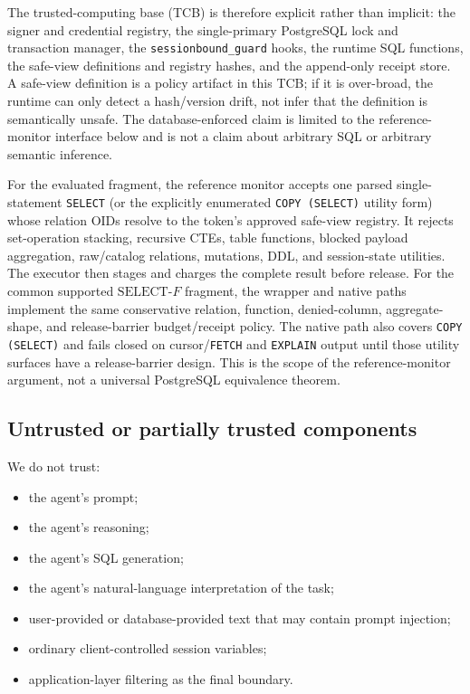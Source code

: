 \documentclass[journal]{IEEEtran}
\providecommand{\tightlist}{%
  \setlength{\itemsep}{0pt}\setlength{\parskip}{0pt}}
\begin{document}
The trusted-computing base (TCB) is therefore explicit rather than implicit:
the signer and credential registry, the single-primary PostgreSQL lock and
transaction manager, the \texttt{sessionbound\_guard} hooks, the runtime SQL
functions, the safe-view definitions and registry hashes, and the append-only
receipt store. A safe-view definition is a policy artifact in this TCB; if it
is over-broad, the runtime can only detect a hash/version drift, not infer that
the definition is semantically unsafe. The database-enforced claim is limited
to the reference-monitor interface below and is not a claim about arbitrary
SQL or arbitrary semantic inference.

For the evaluated fragment, the reference monitor accepts one parsed
single-statement \texttt{SELECT} (or the explicitly enumerated
\texttt{COPY (SELECT)} utility form) whose relation OIDs resolve to the token's approved
safe-view registry. It rejects set-operation stacking, recursive CTEs, table
functions, blocked payload aggregation, raw/catalog relations, mutations,
DDL, and session-state utilities. The executor then stages and charges the
complete result before release. For the common supported
\(\mathrm{SELECT}\text{-}F\) fragment, the wrapper and native paths implement
the same conservative relation, function, denied-column, aggregate-shape, and
release-barrier budget/receipt policy. The native path also covers
\texttt{COPY (SELECT)} and fails closed on cursor/\texttt{FETCH} and
\texttt{EXPLAIN} output until those utility surfaces have a release-barrier
design.
This is the scope of the reference-monitor argument, not a universal PostgreSQL
equivalence theorem.

\hypertarget{untrusted-or-partially-trusted-components}{%
\subsection{Untrusted or partially trusted
components}\label{untrusted-or-partially-trusted-components}}

We do not trust:

\begin{itemize}
\tightlist
\item
  the agent's prompt;
\item
  the agent's reasoning;
\item
  the agent's SQL generation;
\item
  the agent's natural-language interpretation of the task;
\item
  user-provided or database-provided text that may contain prompt
  injection;
\item
  ordinary client-controlled session variables;
\item
  application-layer filtering as the final boundary.
\end{itemize}
\end{document}
